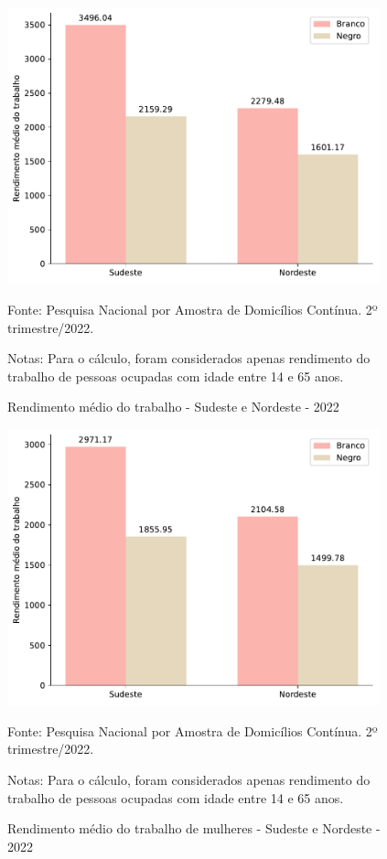 \documentclass[12pt]{article}
\begin{document}
\begin{figure}[H]
    \centering
    \caption{Rendimento médio do trabalho - Sudeste e Nordeste - 2022}
        \includegraphics[height=8cm]{../figures/wage_2002_region.pdf}
    \label{fig:rendimento_regiao}
    \begin{floatnotes}
        \item[Fonte:] Pesquisa Nacional por Amostra de Domicílios Contínua. 2º trimestre/2022.
        \item[Notas:] Para o cálculo, foram considerados apenas rendimento do trabalho de pessoas ocupadas com idade entre 14 e 65 anos.
    \end{floatnotes}
\end{figure}

\begin{figure}[H]
    \centering
    \caption{Rendimento médio do trabalho de mulheres - Sudeste e Nordeste - 2022}
        \includegraphics[height=8cm]{../figures/wage_2002_region_women.pdf}
    \label{fig:rendimento_regiao_sexo}
    \begin{floatnotes}
        \item[Fonte:] Pesquisa Nacional por Amostra de Domicílios Contínua. 2º trimestre/2022.
        \item[Notas:] Para o cálculo, foram considerados apenas rendimento do trabalho de pessoas ocupadas com idade entre 14 e 65 anos.
    \end{floatnotes}
\end{figure}
\end{document}

